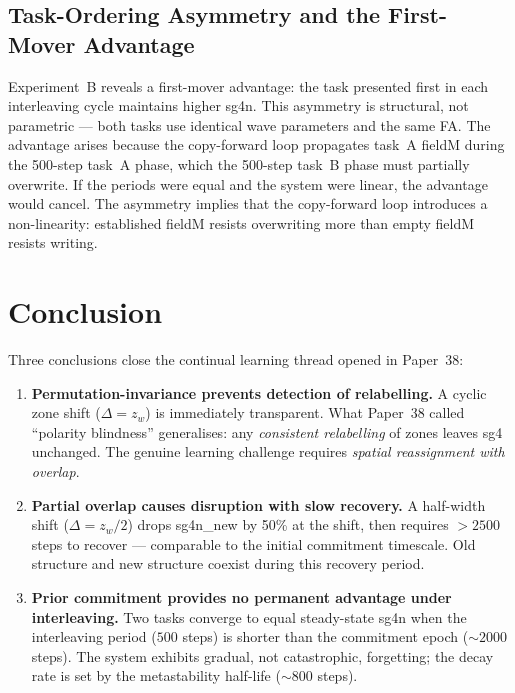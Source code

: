 \documentclass[11pt]{article}
\begin{document}
\subsection{Task-Ordering Asymmetry and the First-Mover Advantage}

Experiment~B reveals a first-mover advantage: the task presented first in each interleaving
cycle maintains higher sg4n.
This asymmetry is structural, not parametric --- both tasks use identical wave parameters
and the same FA.
The advantage arises because the copy-forward loop propagates task~A fieldM during the
500-step task~A phase, which the 500-step task~B phase must partially overwrite.
If the periods were equal and the system were linear, the advantage would cancel.
The asymmetry implies that the copy-forward loop introduces a non-linearity:
established fieldM resists overwriting more than empty fieldM resists writing.

\section{Conclusion}

Three conclusions close the continual learning thread opened in Paper~38:

\begin{enumerate}
  \item \textbf{Permutation-invariance prevents detection of relabelling.}
        A cyclic zone shift ($\Delta = z_w$) is immediately transparent.
        What Paper~38 called ``polarity blindness'' generalises:
        any \emph{consistent relabelling} of zones leaves sg4 unchanged.
        The genuine learning challenge requires \emph{spatial reassignment with overlap}.

  \item \textbf{Partial overlap causes disruption with slow recovery.}
        A half-width shift ($\Delta = z_w/2$) drops sg4n\_new by 50\% at the shift,
        then requires $>2500$ steps to recover --- comparable to the initial
        commitment timescale.
        Old structure and new structure coexist during this recovery period.

  \item \textbf{Prior commitment provides no permanent advantage under interleaving.}
        Two tasks converge to equal steady-state sg4n when the interleaving period
        ($500$ steps) is shorter than the commitment epoch ($\sim2000$ steps).
        The system exhibits gradual, not catastrophic, forgetting;
        the decay rate is set by the metastability half-life ($\sim800$ steps).
\end{enumerate}
\end{document}
